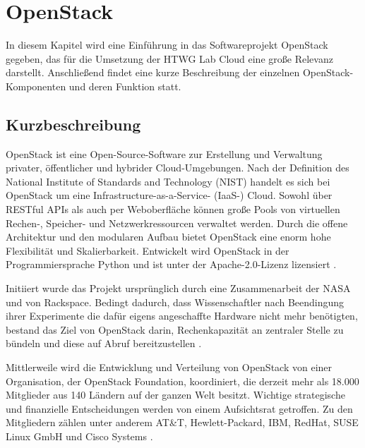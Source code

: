 \chapter{OpenStack}

In diesem Kapitel wird eine Einführung in das Softwareprojekt OpenStack gegeben, das für die Umsetzung der HTWG Lab Cloud eine große Relevanz darstellt. Anschließend findet eine kurze Beschreibung der einzelnen OpenStack-Komponenten und deren Funktion statt.

\section{Kurzbeschreibung}OpenStack ist eine Open-Source-Software zur Erstellung und Verwaltung privater, öffentlicher und hybrider Cloud-Umgebungen. Nach der Definition des National Institute of Standards and Technology (NIST) handelt es sich bei OpenStack um eine Infrastructure-as-a-Service- (IaaS-) Cloud. Sowohl über RESTful APIs als auch per Weboberfläche können große Pools von virtuellen Rechen-, Speicher- und Netzwerkressourcen verwaltet werden. Durch die offene Architektur und den modularen Aufbau bietet OpenStack eine enorm hohe Flexibilität und Skalierbarkeit. Entwickelt wird OpenStack in der Programmiersprache Python und ist unter der Apache-2.0-Lizenz lizensiert \cite[S. 7ff]{Beitter}. 

Initiiert wurde das Projekt ursprünglich durch eine Zusammenarbeit der NASA und von Rackspace. Bedingt dadurch, dass Wissenschaftler nach Beendingung ihrer Experimente die dafür eigens angeschaffte Hardware nicht mehr benötigten, bestand das Ziel von OpenStack darin, Rechenkapazität an zentraler Stelle zu bündeln und diese auf Abruf bereitzustellen \cite[]{Loschwitz}.

Mittlerweile wird die Entwicklung und Verteilung von OpenStack von einer Organisation, der OpenStack Foundation, koordiniert, die derzeit mehr als 18.000 Mitglieder aus 140 Ländern auf der ganzen Welt besitzt. Wichtige strategische und finanzielle Entscheidungen werden von einem Aufsichtsrat getroffen. Zu den Mitgliedern zählen unter anderem AT\&T, Hewlett-Packard, IBM, RedHat, SUSE Linux GmbH und Cisco Systems \cite[]{OpenStackFoundation}.

